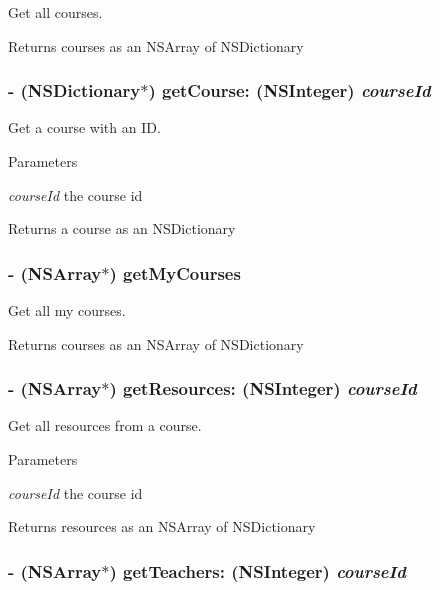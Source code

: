 Get all courses. \begin{DoxyReturn}{Returns}
courses as an NSArray of NSDictionary 
\end{DoxyReturn}
\hypertarget{interface_moodle_a2abf5272330348bfac86e2714874ed10}{
\subsubsection[{getCourse:}]{\setlength{\rightskip}{0pt plus 5cm}-\/ (NSDictionary$\ast$) getCourse: (NSInteger) {\em courseId}}}
\label{interface_moodle_a2abf5272330348bfac86e2714874ed10}


Get a course with an ID. 
\begin{DoxyParams}{Parameters}
\item[{\em courseId}]the course id \end{DoxyParams}
\begin{DoxyReturn}{Returns}
a course as an NSDictionary 
\end{DoxyReturn}
\hypertarget{interface_moodle_a5ea7cf4b73cc15399410a1c7d8875984}{
\subsubsection[{getMyCourses}]{\setlength{\rightskip}{0pt plus 5cm}-\/ (NSArray$\ast$) getMyCourses }}
\label{interface_moodle_a5ea7cf4b73cc15399410a1c7d8875984}


Get all my courses. \begin{DoxyReturn}{Returns}
courses as an NSArray of NSDictionary 
\end{DoxyReturn}
\hypertarget{interface_moodle_a71ccbe28df5d535d316ac3de507d1bc7}{
\subsubsection[{getResources:}]{\setlength{\rightskip}{0pt plus 5cm}-\/ (NSArray$\ast$) getResources: (NSInteger) {\em courseId}}}
\label{interface_moodle_a71ccbe28df5d535d316ac3de507d1bc7}


Get all resources from a course. 
\begin{DoxyParams}{Parameters}
\item[{\em courseId}]the course id \end{DoxyParams}
\begin{DoxyReturn}{Returns}
resources as an NSArray of NSDictionary 
\end{DoxyReturn}
\hypertarget{interface_moodle_ad24bfc36948fc830ad21c7867b8e3793}{
\subsubsection[{getTeachers:}]{\setlength{\rightskip}{0pt plus 5cm}-\/ (NSArray$\ast$) getTeachers: (NSInteger) {\em courseId}}}
\label{interface_moodle_ad24bfc36948fc830ad21c7867b8e3793}


